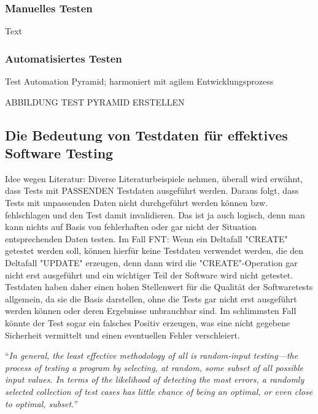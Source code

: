 \subsubsection*{Manuelles Testen}\label{subsubsec:manuelltest}
Text

\subsubsection*{Automatisiertes Testen}\label{subsubsec:autotest}
Test Automation Pyramid; harmoniert mit agilem Entwicklungsprozess \cite{contan:2018}

ABBILDUNG TEST PYRAMID ERSTELLEN

\subsection{Die Bedeutung von Testdaten für effektives Software Testing}\label{subsec:testdaten}
Idee wegen Literatur: Diverse Literaturbeispiele nehmen, überall wird erwähnt, dass Tests mit PASSENDEN Testdaten ausgeführt werden. Daraus folgt, dass Tests mit unpassenden Daten nicht durchgeführt werden können bzw. fehlschlagen und den Test damit invalidieren. Das ist ja auch logisch, denn man kann nichts auf Basis von fehlerhaften oder gar nicht der Situation entsprechenden Daten testen. Im Fall FNT: Wenn ein Deltafall "CREATE" getestet werden soll, können hierfür keine Testdaten verwendet werden, die den Deltafall "UPDATE" erzeugen, denn dann wird die "CREATE"-Operation gar nicht erst ausgeführt und ein wichtiger Teil der Software wird nicht getestet. Testdaten haben daher einen hohen Stellenwert für die Qualität der Softwaretests allgemein, da sie die Basis darstellen, ohne die Tests gar nicht erst ausgeführt werden können oder deren Ergebnisse unbrauchbar sind. Im schlimmsten Fall könnte der Test sogar ein falsches Positiv erzeugen, was eine nicht gegebene Sicherheit vermittelt und einen eventuellen Fehler verschleiert.

\enquote{\textit{In general, the least effective methodology of all is random-input
testing—the process of testing a program by selecting, at random, some
subset of all possible input values. In terms of the likelihood of detecting
the most errors, a randomly selected collection of test cases has little
chance of being an optimal, or even close to optimal, subset.}} \cite[S. 41]{myers:2011}